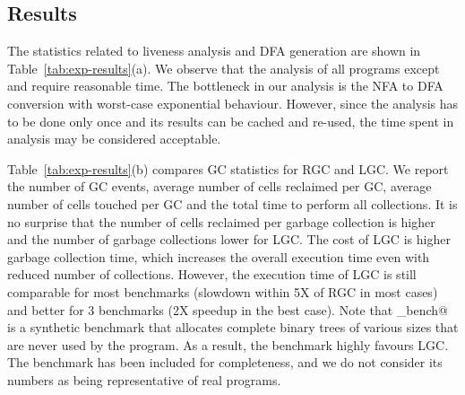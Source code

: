 \documentclass[9pt,preprint,letter,nonatbib]{sigplanconf}
\begin{document}




\subsection{Results}

The statistics  related to  liveness analysis  and DFA  generation are
shown in Table~\ref{tab:exp-results}(a). We  observe that the analysis
of  all  programs  except \verb@treejoin@  and  \verb@sudoku@  require
reasonable time.   The bottleneck in  our analysis  is the NFA  to DFA
conversion with  worst-case exponential behaviour. However,  since the
analysis has  to be  done only  once and its  results can be cached and
re-used, the time spent in analysis may be considered acceptable.


Table~\ref{tab:exp-results}(b) compares  GC statistics
for RGC and  LGC.  We report the number of  GC events,
average  number of  cells  reclaimed per  GC,  average
number of cells  touched per GC and the  total time to
perform all collections.   It is no surprise that the  number of cells
reclaimed per garbage  collection is higher and the  number of garbage
collections  lower  for  LGC.   The  cost of  LGC  is  higher  garbage
collection time, which increases the  overall execution time even with
reduced number of  collections.  However, the execution time  of LGC is
still comparable for most benchmarks (slowdown within 5X of
RGC in most cases) and better  for 3 benchmarks (2X speedup in the
best case).  Note that  \verb@gc_bench@~\cite{gc_bench} is a synthetic
benchmark that allocates complete binary
trees  of various  sizes that  are  never used  by the  program. As  a
result,  the benchmark  highly favours  LGC.  The  benchmark has  been
included  for  completeness,  and  we  do  not  consider  its  numbers
as being representative of real programs.
\end{document}
